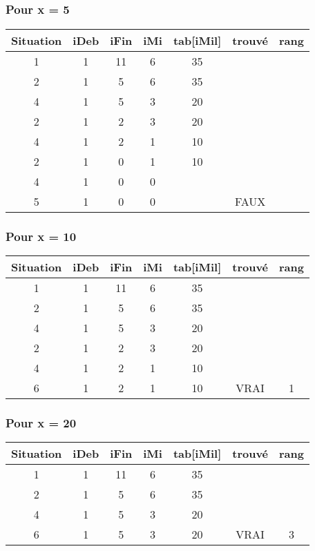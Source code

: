 \documentclass{article}
\begin{document}
		\subsection{}
			\subsubsection{Pour x = 5}
			\begin{tabular}{|c|c|c|c|c|c|c|}
				\hline
					\textbf{Situation} & \textbf{iDeb} & \textbf{iFin} & \textbf{iMi} & \textbf{tab[iMil]} & \textbf{trouvé} & \textbf{rang}\\
				\hline
					1 & 1 & 11 & 6 & 35 & &\\
				\hline
					2 & 1 & 5 & 6 & 35 & &\\ 
				\hline
					4 & 1 & 5 & 3 & 20 & &\\ 
				\hline
					2 & 1 & 2 & 3 & 20 & &\\ 
				\hline
					4 & 1 & 2 & 1 & 10 & &\\ 
				\hline
					2 & 1 & 0 & 1 & 10 & &\\ 
				\hline
					4 & 1 & 0 & 0 & & &\\ 
				\hline
					5 & 1 & 0 & 0 & & FAUX &\\ 
				\hline
			\end{tabular}
			\subsubsection{Pour x = 10}
			\begin{tabular}{|c|c|c|c|c|c|c|}
				\hline
					\textbf{Situation} & \textbf{iDeb} & \textbf{iFin} & \textbf{iMi} & \textbf{tab[iMil]} & \textbf{trouvé} & \textbf{rang}\\
				\hline
					1 & 1 & 11 & 6 & 35 & &\\
				\hline
					2 & 1 & 5 & 6 & 35 & &\\ 
				\hline
					4 & 1 & 5 & 3 & 20 & &\\ 
				\hline
					2 & 1 & 2 & 3 & 20 & &\\ 
				\hline
					4 & 1 & 2 & 1 & 10 & &\\ 
				\hline
					6 & 1 & 2 & 1 & 10 & VRAI & 1\\ 
				\hline
			\end{tabular}
			\subsubsection{Pour x = 20}
			\begin{tabular}{|c|c|c|c|c|c|c|}
				\hline
					\textbf{Situation} & \textbf{iDeb} & \textbf{iFin} & \textbf{iMi} & \textbf{tab[iMil]} & \textbf{trouvé} & \textbf{rang}\\
				\hline
					1 & 1 & 11 & 6 & 35 & &\\
				\hline
					2 & 1 & 5 & 6 & 35 & &\\ 
				\hline
					4 & 1 & 5 & 3 & 20 & &\\ 
				\hline
					6 & 1 & 5 & 3 & 20 & VRAI & 3\\ 
				\hline
			\end{tabular}
\end{document}

